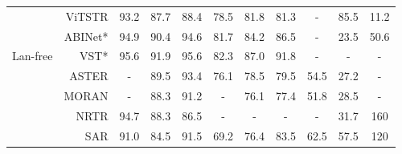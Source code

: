 \documentclass{article}
\begin{document}
\begin{table*}[ht]
{\begin{tabular}{c|r|ccc|ccc|c|cc}
                                & ViTSTR\cite{atienza2021vitstr}     & 93.2                                 & 87.7                                 & 88.4                                 & 78.5                                 & 81.8                                 & 81.3                                 & -                                   & 85.5                    & 11.2                      \\
                                & ABINet*\cite{fang2021abinet}    & 94.9                                 & 90.4                                 & 94.6                                 & 81.7                                 & 84.2                                 & 86.5                                 & -                                   & 23.5                    & 50.6                    \\
\multirow{-7}{*}{Lan-free}     & VST*\cite{tang2021vst}       & 95.6                                 & 91.9                                 & 95.6                                 & 82.3                                 & 87.0                                 & 91.8                                 & -                                   & -                        & -                       \\
\midrule
                                & ASTER\cite{shi2019aster}      & -                                    & 89.5                                 & 93.4                                 & 76.1                                 & 78.5                                 & 79.5                                 & 54.5                                & 27.2                     & -                       \\
                                & MORAN\cite{Luo2019MORAN}      & -                                    & 88.3                                 & 91.2                                 & -                                    & 76.1                                 & 77.4                                 & 51.8                                & 28.5                     & -                       \\
                                & NRTR\cite{Sheng2019nrtr}      & 94.7                                 & 88.3                                 & 86.5                                 & -                                    & -                                    & -                                    & -                                   & 31.7                        & 160                       \\
                                & SAR\cite{li2019sar}       & 91.0                                 & 84.5                                 & 91.5                                 & 69.2                                 & 76.4                                 & 83.5                                 & 62.5                                & 57.5                     & 120                       \\
                               

\end{tabular}}
\end{table*}
\end{document}
